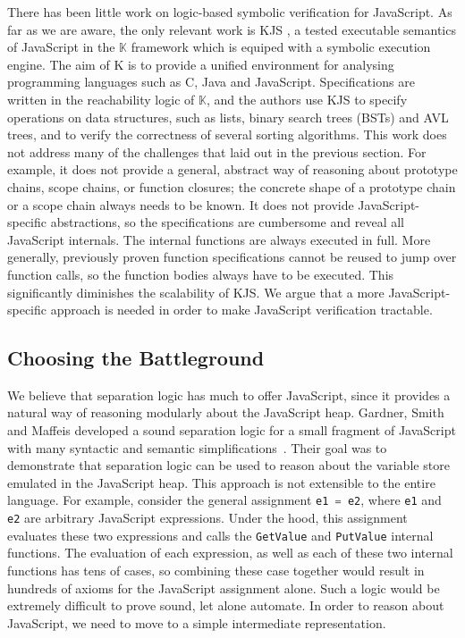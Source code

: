 \documentclass{llncs}
\def\jsinline{\lstinline[language=JavaScript, basicstyle=\small]}
\begin{document}
There has been little work on logic-based symbolic verification for JavaScript. As
far as we are aware, the only relevant work is KJS
\cite{Park:2015,stefanescu-park-yuwen-li-rosu-2016-oopsla}, a tested
executable semantics of JavaScript in the $\mathbb{K}$ framework
\cite{rosu-serbanuta-2010-jlap} which is equiped with a symbolic
execution engine. The aim of K is to provide a unified environment for
analysing programming languages such as C, Java and JavaScript.
Specifications are written in the reachability logic of $\mathbb{K}$,
and the authors use KJS to specify operations on data structures, such
as lists, binary search trees (BSTs) and AVL trees, and to verify the correctness
of several sorting algorithms. This work does not address many
of the challenges that laid out in the previous section. For example,
it does not provide a general, abstract way of reasoning about
prototype chains, scope chains, or function closures; the concrete
shape of a prototype chain or a scope chain always needs to be known.
It does not provide JavaScript-specific abstractions, so the
specifications are cumbersome and reveal all JavaScript internals. 
The internal functions are always executed in full. 
More generally, previously proven function specifications cannot be reused to 
jump over function calls, so the function bodies always have to be executed. 
This significantly diminishes the scalability of KJS. We argue
that a more JavaScript-specific approach is needed in order
to make JavaScript verification tractable.

\subsection{Choosing the Battleground} 

We believe that separation logic has much to offer JavaScript, since
it provides a natural way of reasoning modularly about the JavaScript
heap.  Gardner, Smith and Maffeis developed a sound separation logic
for a small fragment of JavaScript with many syntactic and semantic
simplifications~\cite{gardner:popl:2012}. Their goal was to demonstrate that
separation logic can be used to reason about the variable store
emulated in the JavaScript heap. 
%
This approach is not extensible to the entire language.  
For example, consider the general assignment \jsinline|e1 = e2|, where \jsinline|e1| and \jsinline|e2| are arbitrary JavaScript expressions. 
Under the hood, this assignment evaluates these two expressions and calls the \jsinline|GetValue| and \jsinline|PutValue| internal functions. 
The evaluation of each expression, as well as each of these two internal functions has tens of cases, so combining these case together would result in hundreds of axioms for the JavaScript assignment alone. 
Such a logic would be extremely difficult to prove sound, let alone automate.
In order to reason about JavaScript, we need to move to a simple intermediate representation. 
\end{document}
